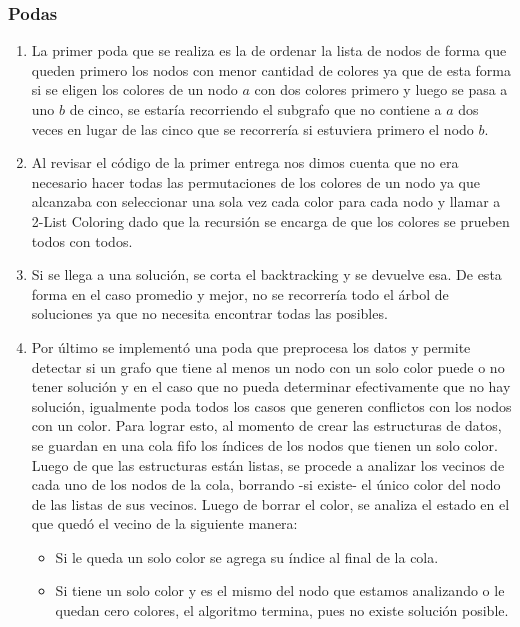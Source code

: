 \subsubsection{Podas}
\label{sec:podas}
\begin{enumerate}
	\item \label{it:p1} La primer poda que se realiza es la de ordenar la lista de nodos de forma que queden primero los nodos con menor cantidad de colores ya que de esta forma si se eligen los colores de un nodo $a$ con dos colores primero y luego se pasa a uno $b$ de cinco, se estaría recorriendo el subgrafo que no contiene a $a$ dos veces en lugar de las cinco que se recorrería si estuviera primero el nodo $b$.

	\item \label{it:p2} Al revisar el código de la primer entrega nos dimos cuenta que no era necesario hacer todas las permutaciones de los colores de un nodo ya que alcanzaba con seleccionar una sola vez cada color para cada nodo y llamar a 2-List Coloring dado que la recursión se encarga de que los colores se prueben todos con todos.

	\item \label{it:p3} Si se llega a una solución, se corta el backtracking y se devuelve esa. De esta forma en el caso promedio y mejor, no se recorrería todo el árbol de soluciones ya que no necesita encontrar todas las posibles.
	\item \label{it:p4} Por último se implementó una poda que preprocesa los datos y permite detectar si un grafo que tiene al menos un nodo con un solo color puede o no tener solución y en el caso que no pueda determinar efectivamente que no hay solución, igualmente poda todos los casos que generen conflictos con los nodos con un color. Para lograr esto, al momento de crear las estructuras de datos, se guardan en una cola fifo los índices de los nodos que tienen un solo color. Luego de que las estructuras están listas, se procede a analizar los vecinos de cada uno de los nodos de la cola, borrando -si existe- el único color del nodo de las listas de sus vecinos. Luego de borrar el color, se analiza el estado en el que quedó el vecino de la siguiente manera:
	\begin{itemize}
	\item Si le queda un solo color se agrega su índice al final de la cola.
	\item Si tiene un solo color y es el mismo del nodo que estamos analizando o le quedan cero colores, el algoritmo termina, pues no existe solución posible.
	\end{itemize}

\end{enumerate}

